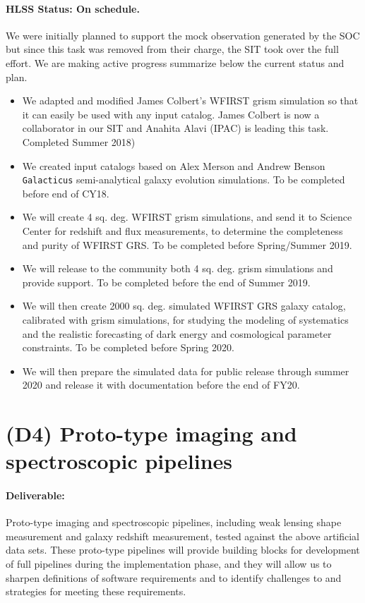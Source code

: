 \paragraph*{HLSS Status: On schedule.} We were initially planned to support the mock observation generated by the SOC but since this task was removed from their charge, the SIT took over the full effort. We are making active progress summarize below the current status and plan.
\begin{itemize}
\item We adapted and modified James Colbert's WFIRST grism simulation so that it can easily be used with any input catalog. James Colbert is now a collaborator in our SIT and Anahita Alavi (IPAC) is leading this task. Completed Summer 2018)
\item We created input catalogs based on Alex Merson and Andrew Benson \texttt{Galacticus} semi-analytical galaxy evolution simulations. To be completed before end of CY18.
\item We will create 4 sq. deg. WFIRST grism simulations, and send it to Science Center for redshift and flux measurements, to determine the completeness and purity of WFIRST GRS.  To be completed before Spring/Summer 2019.
\item We will release to the community both 4 sq. deg. grism simulations and provide support. To be completed before the end of Summer 2019.
\item We will then create 2000 sq. deg. simulated WFIRST GRS galaxy catalog, calibrated with grism simulations, for studying the modeling of systematics and the realistic forecasting of dark energy and cosmological parameter constraints. To be completed before Spring 2020.
\item We will then prepare the simulated data for public release through summer 2020 and release it with documentation before the end of FY20.
\end{itemize}


\section*{(D4) Proto-type imaging and spectroscopic pipelines}

\paragraph*{Deliverable:} Proto-type imaging and spectroscopic pipelines,
including weak lensing shape measurement and galaxy redshift measurement, tested
against the above artificial data sets. These proto-type pipelines will provide
building blocks for development of full pipelines during the implementation
phase, and they will allow us to sharpen definitions of software requirements
and to identify challenges to and strategies for meeting these requirements.

